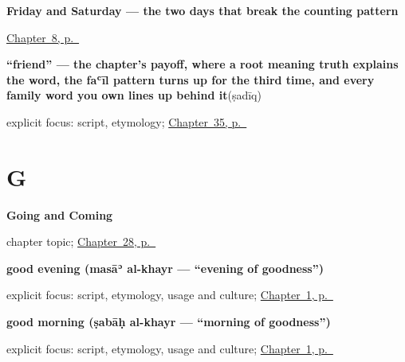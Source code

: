\noindent\begin{minipage}[t]{\linewidth}
\raggedright
\textbf{Friday and Saturday — the two days that break the counting pattern}\enspace\emph{ }\par
\footnotesize \hyperref[ch:ar-days-of-the-week]{Chapter~8, p.~\pageref*{ch:ar-days-of-the-week}}
\end{minipage}\par\smallskip

\noindent\begin{minipage}[t]{\linewidth}
\raggedright
\textbf{\textquotedblleft{}friend\textquotedblright{} — the chapter's payoff, where a root meaning truth explains the word, the faʿīl pattern turns up for the third time, and every family word you own lines up behind it}\enspace\emph{}\enspace(ṣadīq)\par
\footnotesize explicit focus: script, etymology; \hyperref[ch:ar-people-you-introduce]{Chapter~35, p.~\pageref*{ch:ar-people-you-introduce}}
\end{minipage}\par\smallskip

\section*{G}

\noindent\begin{minipage}[t]{\linewidth}
\raggedright
\textbf{Going and Coming}\par
\footnotesize chapter topic; \hyperref[ch:ar-going-and-coming]{Chapter~28, p.~\pageref*{ch:ar-going-and-coming}}
\end{minipage}\par\smallskip

\noindent\begin{minipage}[t]{\linewidth}
\raggedright
\textbf{good evening (masāʾ al-khayr — \textquotedblleft{}evening of goodness\textquotedblright{})}\enspace\emph{ }\par
\footnotesize explicit focus: script, etymology, usage and culture; \hyperref[ch:greetings]{Chapter~1, p.~\pageref*{ch:greetings}}
\end{minipage}\par\smallskip

\noindent\begin{minipage}[t]{\linewidth}
\raggedright
\textbf{good morning (ṣabāḥ al-khayr — \textquotedblleft{}morning of goodness\textquotedblright{})}\enspace\emph{ }\par
\footnotesize explicit focus: script, etymology, usage and culture; \hyperref[ch:greetings]{Chapter~1, p.~\pageref*{ch:greetings}}
\end{minipage}\par\smallskip

